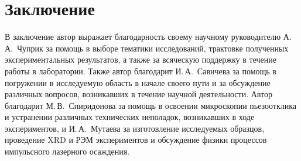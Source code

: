\chapter*{Заключение}                       %




В заключение автор выражает благодарность своему научному руководителю А.\,А.~Чуприк за помощь в выборе тематики исследований, трактовке полученных экспериментальных результатов, а также за всяческую поддержку в течение работы в лаборатории. Также автор благодарит И.\,А.~Савичева за помощь в погружении в исследуемую область в начале своего пути и за обсуждение различных вопросов, возникавших в течение научной деятельности. Автор  благодарит М.\,В.~Спиридонова за помощь в освоении микроскопии пьезоотклика и устранении различных технических неполадок, возникавших в ходе экспериментов, и И.\,А.~Мутаева за изготовление исследуемых образцов, проведение XRD и РЭМ экспериментов и обсуждение физики процессов импульсного лазерного осаждения.
